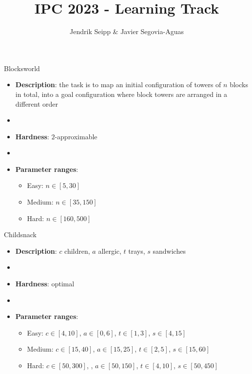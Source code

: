 \documentclass[aspectratio=169,xcolor=dvipsnames]{beamer}
\title[short title]{IPC 2023 - Learning Track} %
\author[Allauthors] {Jendrik Seipp \& Javier Segovia-Aguas}
\date{} %
\begin{document}
\begin{frame}
    \titlepage
    
\end{frame}

\begin{frame}{Blocksworld}

    \begin{itemize}
        \item \textbf{Description}: the task is to map an initial configuration of towers of $n$ blocks in total, into a goal configuration where block towers are arranged in a different order
        \item[]
        \item \textbf{Hardness}: $2$-approximable 
        \item[]
        \item \textbf{Parameter ranges}: 
        \begin{itemize}
            \item Easy: $n \in [5, 30]$
            \item Medium: $n \in [35, 150]$
            \item Hard: $n \in [160, 500]$
        \end{itemize}
    \end{itemize}
    
\end{frame}

\begin{frame}{Childsnack}

    \begin{itemize}
        \item \textbf{Description}: $c$ children, $a$ allergic, $t$ trays, $s$ sandwiches %
        \item[]
        \item \textbf{Hardness}: optimal
        \item[]
        \item \textbf{Parameter ranges}: 
        \begin{itemize}
            \item Easy: $c\in[4, 10]$, $a\in[0, 6]$, $t\in[1, 3]$, $s\in[4, 15]$
            \item Medium: $c\in[15, 40]$, $a\in[15, 25]$, $t\in[2, 5]$, $s\in[15, 60]$
            \item Hard: $c\in[50, 300]$, , $a\in[50, 150]$, $t\in[4, 10]$, $s\in[50, 450]$
        \end{itemize}
    \end{itemize}
    
\end{frame}
\end{document}

